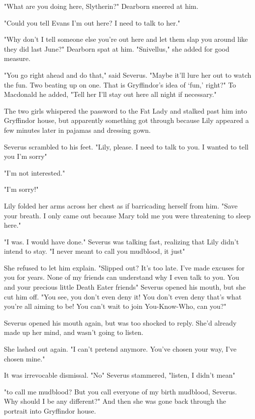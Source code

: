 "What are you doing here, Slytherin?" Dearborn sneered at him.

"Could you tell Evans I'm out here? I need to talk to her."

"Why don't I tell someone else you're out here and let them slap you around like they did last June?" Dearborn spat at him. "Snivellus," she added for good measure.

"You go right ahead and do that," said Severus. "Maybe it'll lure her out to watch the fun. Two beating up on one. That is Gryffindor's idea of `fun,' right?" To Macdonald he added, "Tell her I'll stay out here all night if necessary."

The two girls whispered the password to the Fat Lady and stalked past him into Gryffindor house, but apparently something got through because Lily appeared a few minutes later in pajamas and dressing gown.

Severus scrambled to his feet. "Lily, please. I need to talk to you. I wanted to tell you I'm sorry{\el}"

"I'm not interested."

"I'm sorry!"

Lily folded her arms across her chest as if barricading herself from him. "Save your breath. I only came out because Mary told me you were threatening to sleep here."

"I was. I would have done." Severus was talking fast, realizing that Lily didn't intend to stay. "I never meant to call you mudblood, it just{\el}"

She refused to let him explain. "Slipped out? It's too late. I've made excuses for you for years. None of my friends can understand why I even talk to you. You and your precious little Death Eater friends{\el}" Severus opened his mouth, but she cut him off. "You see, you don't even deny it! You don't even deny that's what you're all aiming to be! You can't wait to join You-Know-Who, can you?"

Severus opened his mouth again, but was too shocked to reply. She'd already made up her mind, and wasn't going to listen.

She lashed out again. "I can't pretend anymore. You've chosen your way, I've chosen mine."

It was irrevocable dismissal. "No{\el}" Severus stammered, "listen, I didn't mean{\el}"

"{\el}to call me mudblood? But you call everyone of my birth mudblood, Severus. Why should I be any different?" And then she was gone back through the portrait into Gryffindor house.

